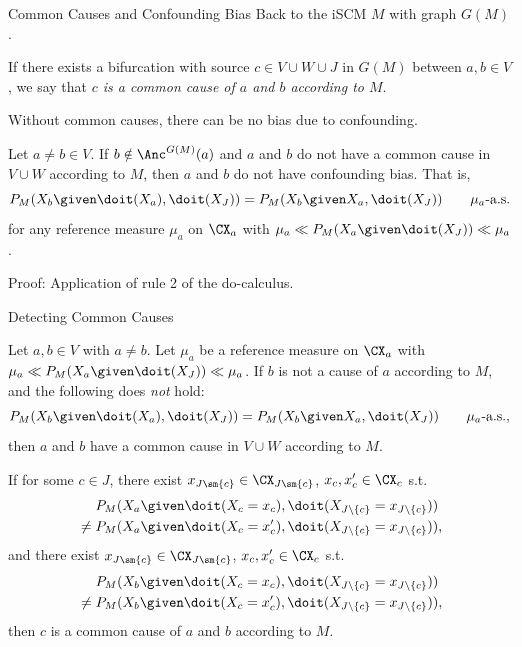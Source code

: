 \begin{frame}{Common Causes and Confounding Bias}
Back to the iSCM $M$ with graph $G(M)$.
\begin{Def}[\ref{def:common_cause_of}]
  If there exists a bifurcation with source $c \in V \cup W \cup J$ in $G(M)$ between $a,b \in V$, we say that \emph{$c$ is a common cause of $a$ and $b$ according to $M$}.
\end{Def}
Without common causes, there can be no bias due to confounding.
\begin{Prp}[\ref{prp:scm_confounded_separation}]
Let $a \ne b \in V$.
If $b \notin \Anc^{G(M)}(a)$ and $a$ and $b$ do not have a common cause in $V \cup W$ according to $M$, then
$a$ and $b$ do not have confounding bias. That is,
  $$P_{M}(X_b \given \doit(X_a), \doit(X_J)) = P_{M}(X_b \given X_a, \doit(X_J)) \qquad \mu_a\text{-a.s.}$$
for any reference measure $\mu_a$ on $\CX_a$ with $\mu_a \ll P_M(X_a \given \doit(X_J)) \ll \mu_a$.
\end{Prp}
Proof: Application of rule 2 of the do-calculus.
\end{frame}

\begin{frame}{Detecting Common Causes}
\begin{Cor}[\ref{cor:scm_identify_confounder}]
\setlength\abovedisplayskip{5pt}
\setlength\belowdisplayskip{5pt}
Let $a, b \in V$ with $a \ne b$.
Let $\mu_a$ be a reference measure on $\CX_a$ with $\mu_a \ll P_M(X_a \given \doit(X_J)) \ll \mu_a$.
If $b$ is not a cause of $a$ according to $M$, and the following does \emph{not} hold:
  $$P_{M}(X_b \given \doit(X_a), \doit(X_J)) = P_{M}(X_b \given X_a, \doit(X_J)) \qquad \mu_a\text{-a.s.},$$
then $a$ and $b$ have a common cause in $V \cup W$ according to $M$.

If for some $c \in J$, 
there exist $x_{J\sm\{c\}} \in \CX_{J\sm\{c\}}$, $x_c,x_c' \in \CX_c$ s.t.
  \begin{equation*}\begin{split}
        & P_{M}(X_a \given \doit(X_c=x_c),\doit(X_{J\setminus \{c\}}=x_{J\setminus \{c\}})) \\
        {} \ne {} & P_{M}(X_a \given \doit(X_c=x_c'),\doit(X_{J\setminus\{c\}}=x_{J\setminus\{c\}})),
  \end{split}\end{equation*}
and there exist $x_{J\sm\{c\}} \in \CX_{J\sm\{c\}}$, $x_c,x_c' \in \CX_c$ s.t.
      \begin{equation*}\begin{split}
        & P_{M}(X_b \given \doit(X_c=x_c),\doit(X_{J\setminus \{c\}}=x_{J\setminus \{c\}})) \\
        {} \ne {} & P_{M}(X_b \given \doit(X_c=x_c'),\doit(X_{J\setminus\{c\}}=x_{J\setminus\{c\}})),
      \end{split}\end{equation*}
then $c$ is a common cause of $a$ and $b$ according to $M$.
\end{Cor}
\end{frame}

